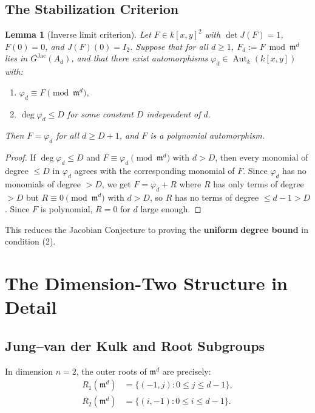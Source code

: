 \documentclass[12pt,a4paper]{article}
\newtheorem{lemma}[theorem]{Lemma}
\theoremstyle{definition}
\newcommand{\kk}{k}
\newcommand{\pp}{\mathfrak{m}}
\newcommand{\Aut}{\operatorname{Aut}}
\newcommand{\GJac}{G^{\mathrm{Jac}}}
\begin{document}
\subsection{The Stabilization Criterion}

\begin{lemma}[Inverse limit criterion]\label{lem:invlim}
Let $F \in \kk[x,y]^2$ with $\det J(F) = 1$, $F(0) = 0$, and $J(F)(0) = I_2$. Suppose
that for all $d \geq 1$, $F_d := F \bmod \pp^d$ lies in $\GJac(A_d)$, and that there exist
automorphisms $\varphi_d \in \Aut_\kk(\kk[x,y])$ with:
\begin{enumerate}
  \item $\varphi_d \equiv F \pmod{\pp^d}$,
  \item $\deg \varphi_d \leq D$ for some constant $D$ independent of $d$.
\end{enumerate}
Then $F = \varphi_d$ for all $d \geq D + 1$, and $F$ is a polynomial automorphism.
\end{lemma}

\begin{proof}
If $\deg \varphi_d \leq D$ and $F \equiv \varphi_d \pmod{\pp^d}$ with $d > D$, then every
monomial of degree $\leq D$ in $\varphi_d$ agrees with the corresponding monomial of $F$.
Since $\varphi_d$ has no monomials of degree $> D$, we get $F = \varphi_d + R$ where $R$
has only terms of degree $> D$ but $R \equiv 0 \pmod{\pp^d}$ with $d > D$, so $R$ has no
terms of degree $\leq d-1 > D$. Since $F$ is polynomial, $R = 0$ for $d$ large enough.
\end{proof}

This reduces the Jacobian Conjecture to proving the \textbf{uniform degree bound} in
condition (2).

\section{The Dimension-Two Structure in Detail}

\subsection{Jung--van der Kulk and Root Subgroups}

In dimension $n = 2$, the outer roots of $\pp^d$ are precisely:
\begin{align*}
R_1(\pp^d) &= \{(-1, j) : 0 \leq j \leq d-1\}, \\
R_2(\pp^d) &= \{(i, -1) : 0 \leq i \leq d-1\}.
\end{align*}
\end{document}
